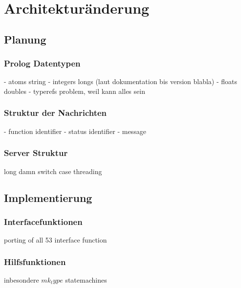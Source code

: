 


\section{Architekturänderung}

\subsection{Planung}




\subsubsection{Prolog Datentypen}

- atoms string
- integers longs (laut dokumentation bis version blabla)
- floats doubles
- typerefs problem, weil kann alles sein

\subsubsection{Struktur der Nachrichten}

- function identifier
- status identifier
- message

\subsubsection{Server Struktur}

long damn switch case
threading





\subsection{Implementierung}

\subsubsection{Interfacefunktionen}

porting of all 53 interface function



\subsubsection{Hilfsfunktionen}

inbesondere $mk_type$
statemachines




